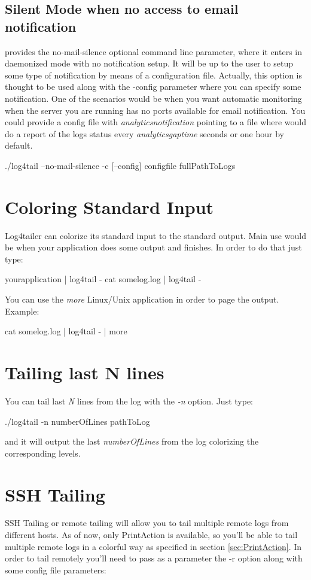 \subsection{Silent Mode when no access to email notification}
\logftailer{} provides the no-mail-silence optional command line parameter,
where it enters in daemonized mode with no notification setup. It will be up to
the user to setup some type of notification by means of a configuration file.
Actually, this option is thought to be used along with the -config parameter
where you can specify some notification. One of the scenarios would be when you
want automatic monitoring when the server you are running \logftailer{} has no
ports available for email notification. You could provide a config file with
\emph{analyticsnotification} pointing to a file where \logftailer{} would do a
report of the logs status every \emph{analyticsgaptime} seconds or one hour by
default.

\begin{cmd}
 ./log4tail --no-mail-silence -c [--config] configfile fullPathToLogs
\end{cmd}


\section{Coloring Standard Input}
Log4tailer can colorize its standard input to the standard output. Main use
would be when your application does some output and finishes. In order to do
that just type:
\begin{cmd}
 yourapplication | log4tail -
 cat somelog.log | log4tail -
\end{cmd}
You can use the \emph{more} Linux/Unix application in order to page the output.
Example:
\begin{cmd}
 cat somelog.log | log4tail - | more
\end{cmd}

\section{Tailing last N lines}
You can tail last \emph{N} lines from the log with the \emph{-n} option. Just type:
\begin{cmd}
 ./log4tail -n numberOfLines pathToLog
\end{cmd}
and it will output the last \emph{numberOfLines} from the log colorizing the
corresponding levels.

\section{SSH Tailing}
SSH Tailing or remote tailing will allow you to tail multiple remote logs from
different hosts. As of now, only PrintAction is available, so you'll be able to
tail multiple remote logs in a colorful way as specified in section
\ref{sec:PrintAction}. In order to tail remotely you'll need to pass as a
parameter the -r option along with some config file parameters:

